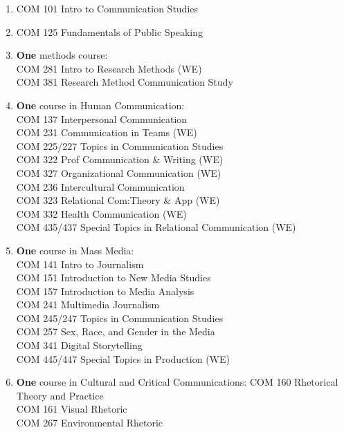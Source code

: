 \documentclass[
  letterpaper,
]{scrbook}
\providecommand{\tightlist}{%
  \setlength{\itemsep}{0pt}\setlength{\parskip}{0pt}}
\begin{document}
\begin{enumerate}
\def\labelenumi{\arabic{enumi}.}
\tightlist
\item
  COM 101 Intro to Communication Studies\\
\item
  COM 125 Fundamentals of Public Speaking\\
\item
  \textbf{One} methods course:\\
  COM 281 Intro to Research Methods (WE)\\
  COM 381 Research Method Communication Study\\
\item
  \textbf{One} course in Human Communication:\\
  COM 137 Interpersonal Communication\\
  COM 231 Communication in Teams (WE)\\
  COM 225/227 Topics in Communication Studies\\
  COM 322 Prof Communication \& Writing (WE)\\
  COM 327 Organizational Communication (WE)\\
  COM 236 Intercultural Communication\\
  COM 323 Relational Com:Theory \& App (WE)\\
  COM 332 Health Communication (WE)\\
  COM 435/437 Special Topics in Relational Communication (WE)\\
\item
  \textbf{One} course in Mass Media:\\
  COM 141 Intro to Journalism\\
  COM 151 Introduction to New Media Studies\\
  COM 157 Introduction to Media Analysis\\
  COM 241 Multimedia Journalism\\
  COM 245/247 Topics in Communication Studies\\
  COM 257 Sex, Race, and Gender in the Media\\
  COM 341 Digital Storytelling\\
  COM 445/447 Special Topics in Production (WE)\\
\item
  \textbf{One} course in Cultural and Critical Communications: COM 160
  Rhetorical Theory and Practice\\
  COM 161 Visual Rhetoric\\
  COM 267 Environmental Rhetoric\\

\end{enumerate}
\end{document}
